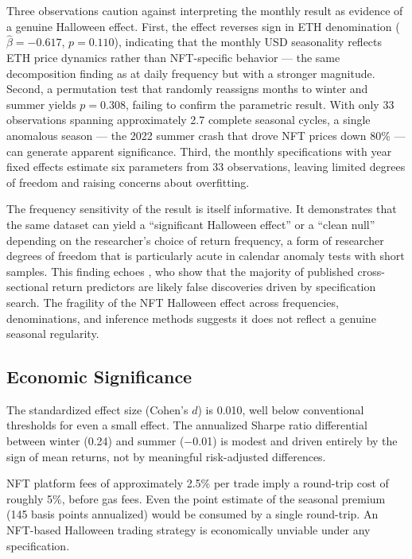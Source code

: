 \documentclass[12pt,a4paper]{article}
\begin{document}
Three observations caution against interpreting the monthly result as evidence of a genuine Halloween effect. First, the effect reverses sign in ETH denomination ($\hat{\beta} = -0.617$, $p = 0.110$), indicating that the monthly USD seasonality reflects ETH price dynamics rather than NFT-specific behavior --- the same decomposition finding as at daily frequency but with a stronger magnitude. Second, a permutation test that randomly reassigns months to winter and summer yields $p = 0.308$, failing to confirm the parametric result. With only 33 observations spanning approximately 2.7 complete seasonal cycles, a single anomalous season --- the 2022 summer crash that drove NFT prices down 80\% --- can generate apparent significance. Third, the monthly specifications with year fixed effects estimate six parameters from 33 observations, leaving limited degrees of freedom and raising concerns about overfitting.

The frequency sensitivity of the result is itself informative. It demonstrates that the same dataset can yield a ``significant Halloween effect'' or a ``clean null'' depending on the researcher's choice of return frequency, a form of researcher degrees of freedom that is particularly acute in calendar anomaly tests with short samples. This finding echoes \citet{harveyliu2016}, who show that the majority of published cross-sectional return predictors are likely false discoveries driven by specification search. The fragility of the NFT Halloween effect across frequencies, denominations, and inference methods suggests it does not reflect a genuine seasonal regularity.

\subsection{Economic Significance}

The standardized effect size (Cohen's $d$) is 0.010, well below conventional thresholds for even a small effect. The annualized Sharpe ratio differential between winter (0.24) and summer ($-$0.01) is modest and driven entirely by the sign of mean returns, not by meaningful risk-adjusted differences.

NFT platform fees of approximately 2.5\% per trade imply a round-trip cost of roughly 5\%, before gas fees. Even the point estimate of the seasonal premium (145 basis points annualized) would be consumed by a single round-trip. An NFT-based Halloween trading strategy is economically unviable under any specification.
\end{document}
